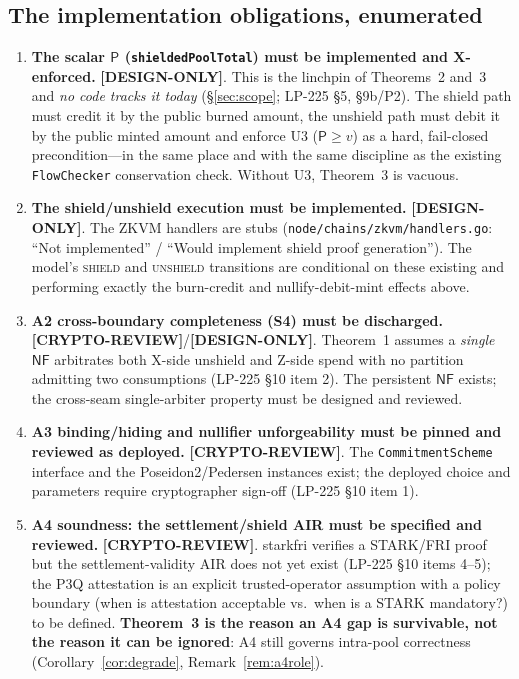 \documentclass[11pt]{article}
\theoremstyle{definition}
\theoremstyle{remark}
\newcommand{\DESIGN}{\textbf{[DESIGN-ONLY]}}
\newcommand{\CRYPTO}{\textbf{[CRYPTO-REVIEW]}}
\newcommand{\pool}{\mathsf{P}}
\newcommand{\NF}{\mathsf{NF}}
\begin{document}
\subsection{The implementation obligations, enumerated}
\label{sec:obligations}

\begin{enumerate}[leftmargin=2em]
\item \textbf{The scalar $\pool$ (\texttt{shieldedPoolTotal}) must be
  implemented and X-enforced.} \DESIGN{}. This is the linchpin of Theorems~2
  and~3 and \emph{no code tracks it today} (\S\ref{sec:scope}; LP-225 \S5,
  \S9b/P2). The shield path must credit it by the public burned amount, the
  unshield path must debit it by the public minted amount and enforce U3
  ($\pool\ge v$) as a hard, fail-closed precondition---in the same place and
  with the same discipline as the existing \texttt{FlowChecker} conservation
  check. Without U3, Theorem~3 is vacuous.

\item \textbf{The shield/unshield execution must be implemented.} \DESIGN{}.
  The ZKVM handlers are stubs
  (\texttt{node/chains/zkvm/handlers.go}: ``Not implemented'' / ``Would
  implement shield proof generation''). The model's \textsc{shield} and
  \textsc{unshield} transitions are conditional on these existing and
  performing exactly the burn-credit and nullify-debit-mint effects above.

\item \textbf{A2 cross-boundary completeness (S4) must be discharged.}
  \CRYPTO{}/\DESIGN{}. Theorem~1 assumes a \emph{single} $\NF$ arbitrates
  both X-side unshield and Z-side spend with no partition admitting two
  consumptions (LP-225 \S10 item 2). The persistent $\NF$ exists; the
  cross-seam single-arbiter property must be designed and reviewed.

\item \textbf{A3 binding/hiding and nullifier unforgeability must be pinned
  and reviewed as deployed.} \CRYPTO{}. The \texttt{CommitmentScheme}
  interface and the Poseidon2/Pedersen instances exist; the deployed choice
  and parameters require cryptographer sign-off (LP-225 \S10 item 1).

\item \textbf{A4 soundness: the settlement/shield AIR must be specified and
  reviewed.} \CRYPTO{}. starkfri verifies a STARK/FRI proof but the
  settlement-validity AIR does not yet exist (LP-225 \S10 items 4--5); the
  P3Q attestation is an explicit trusted-operator assumption with a policy
  boundary (when is attestation acceptable vs.\ when is a STARK mandatory?)
  to be defined. \textbf{Theorem~3 is the reason an A4 gap is survivable,
  not the reason it can be ignored}: A4 still governs intra-pool correctness
  (Corollary~\ref{cor:degrade}, Remark~\ref{rem:a4role}).


\end{enumerate}
\end{document}
